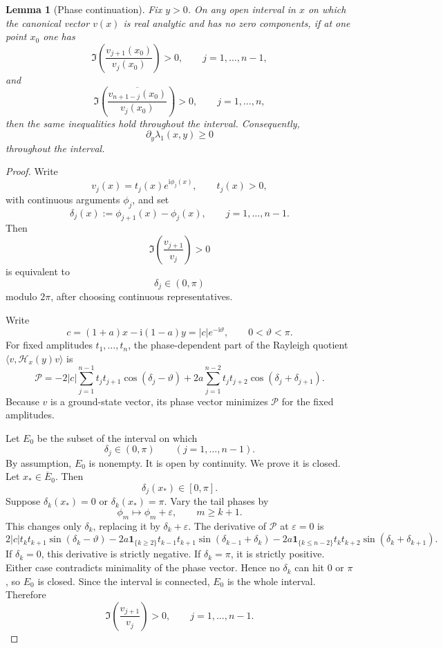 \documentclass[11pt]{amsart}
\numberwithin{equation}{section}
\newcommand{\ii}{\mathrm i}
\newtheorem{lemma}[theorem]{Lemma}
\begin{document}
\begin{lemma}[Phase continuation]\label{lem:phase-continuation}
Fix \(y>0\).  On any open interval in \(x\) on which the canonical vector \(v(x)\) is real analytic and has no zero components, if at one point \(x_0\) one has
\[
\Im\left(\frac{v_{j+1}(x_0)}{v_j(x_0)}\right)>0,
\qquad
j=1,\dots,n-1,
\]
and
\[
\Im\left(\frac{\overline{v_{n+1-j}(x_0)}}{v_j(x_0)}\right)>0,
\qquad
j=1,\dots,n,
\]
then the same inequalities hold throughout the interval.  Consequently,
\[
\partial_y\lambda_1(x,y)\ge0
\]
throughout the interval.
\end{lemma}

\begin{proof}
Write
\[
v_j(x)=t_j(x)e^{\ii\phi_j(x)},
\qquad
t_j(x)>0,
\]
with continuous arguments \(\phi_j\), and set
\[
\delta_j(x):=\phi_{j+1}(x)-\phi_j(x),
\qquad
j=1,\dots,n-1.
\]
Then
\[
\Im\left(\frac{v_{j+1}}{v_j}\right)>0
\]
is equivalent to
\[
\delta_j\in(0,\pi)
\]
modulo \(2\pi\), after choosing continuous representatives.

Write
\[
c=(1+a)x-\ii(1-a)y=|c|e^{-\ii\vartheta},
\qquad
0<\vartheta<\pi.
\]
For fixed amplitudes \(t_1,\dots,t_n\), the phase-dependent part of the Rayleigh quotient \(\langle v,\mathcal H_x(y)v\rangle\) is
\[
\mathcal P
=
-2|c|\sum_{j=1}^{n-1}t_jt_{j+1}\cos(\delta_j-\vartheta)
+
2a\sum_{j=1}^{n-2}t_jt_{j+2}\cos(\delta_j+\delta_{j+1}).
\]
Because \(v\) is a ground-state vector, its phase vector minimizes \(\mathcal P\) for the fixed amplitudes.

Let \(E_0\) be the subset of the interval on which
\[
\delta_j\in(0,\pi)
\qquad
(j=1,\dots,n-1).
\]
By assumption, \(E_0\) is nonempty.  It is open by continuity.  We prove it is closed.  Let \(x_*\in\overline E_0\).  Then
\[
\delta_j(x_*)\in[0,\pi].
\]
Suppose \(\delta_k(x_*)=0\) or \(\delta_k(x_*)=\pi\).  Vary the tail phases by
\[
\phi_m\mapsto\phi_m+\varepsilon,
\qquad
m\ge k+1.
\]
This changes only \(\delta_k\), replacing it by \(\delta_k+\varepsilon\).  The derivative of \(\mathcal P\) at \(\varepsilon=0\) is
\[
2|c|t_kt_{k+1}\sin(\delta_k-\vartheta)
-2a\mathbf 1_{\{k\ge2\}}t_{k-1}t_{k+1}\sin(\delta_{k-1}+\delta_k)
-2a\mathbf 1_{\{k\le n-2\}}t_kt_{k+2}\sin(\delta_k+\delta_{k+1}).
\]
If \(\delta_k=0\), this derivative is strictly negative.  If \(\delta_k=\pi\), it is strictly positive.  Either case contradicts minimality of the phase vector.  Hence no \(\delta_k\) can hit \(0\) or \(\pi\), so \(E_0\) is closed.  Since the interval is connected, \(E_0\) is the whole interval.  Therefore
\[
\Im\left(\frac{v_{j+1}}{v_j}\right)>0,
\qquad
j=1,\dots,n-1.
\]


\end{proof}
\end{document}
